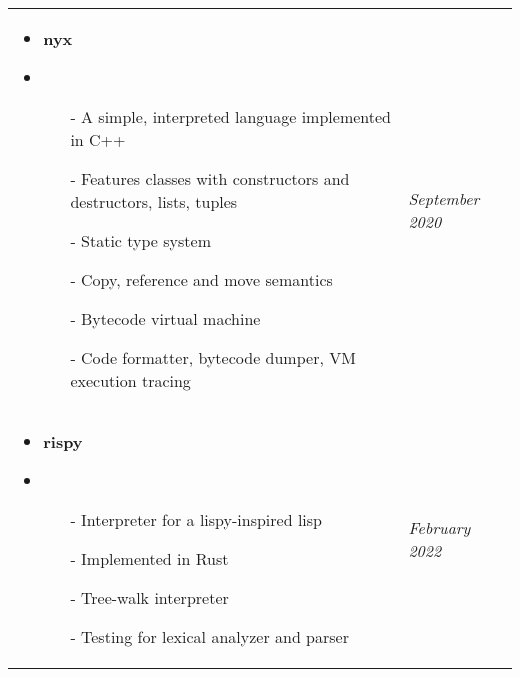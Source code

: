 \documentclass[12pt]{article}
\newcommand{\myhspace}[1]{\hspace*{\fill}{#1}}
\begin{document}
    \vspace{2ex}
    {\renewcommand{\arraystretch}{1.4}
    \begin{tabularx}{\textwidth}{>{\raggedright\arraybackslash}p{}|l}
        \begin{itemize}[nosep,parsep=1ex,itemsep=0.8ex,leftmargin=0.1ex]
            \item\vspace{-1.6ex}\textbf{nyx}\myhspace{\url{https://github.com/dc03/nyx}}
            \item\begin{itemize}[itemsep=0.5ex, leftmargin=3.5ex]
                \item[-] A simple, interpreted language implemented in C++
                \item[-] Features classes with constructors and destructors, lists, tuples
                \item[-] Static type system
                \item[-] Copy, reference and move semantics
                \item[-] Bytecode virtual machine
                \item[-] Code formatter, bytecode dumper, VM execution tracing
            \end{itemize}
        \end{itemize} &
        \textit{September 2020} \\

        \begin{itemize}[nosep,parsep=1ex,itemsep=0.8ex,leftmargin=0.1ex]
            \item\vspace{-1.6ex}\textbf{rispy}\myhspace{\url{https://github.com/dc03/rispy}}
            \item\begin{itemize}[itemsep=0.5ex, leftmargin=3.5ex]
                \item[-] Interpreter for a lispy-inspired lisp
                \item[-] Implemented in Rust
                \item[-] Tree-walk interpreter
                \item[-] Testing for lexical analyzer and parser
            \end{itemize}
        \end{itemize} &
        \textit{February 2022} \\


\end{tabularx}}
\end{document}
